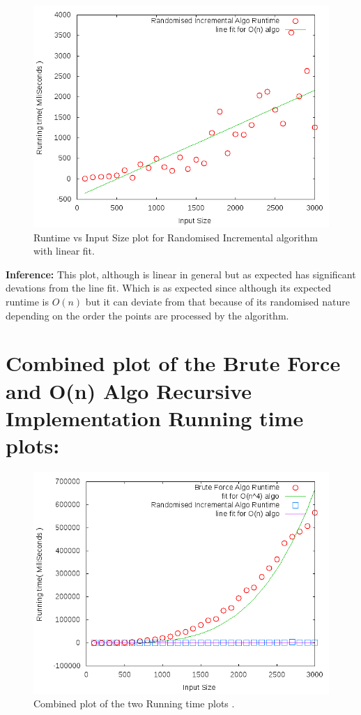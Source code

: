 \documentclass{article}
\begin{document}
\begin{figure}[th]%
\centering

\includegraphics[width=0.5\columnwidth]{incr1.png}%
\caption{Runtime vs Input Size plot for Randomised Incremental algorithm with linear fit. }
\label{fig:proto}%
\end{figure}
\textbf{Inference:} This plot, although is linear in general but as expected has significant devations from the line fit. Which is as expected since although its expected runtime is $O(n)$ but it can deviate from that because of its randomised nature depending on the order the points are processed by the algorithm. 

\newpage

\section*{Combined plot of the Brute Force and O(n) Algo Recursive Implementation Running time plots:}

\begin{figure}[th]%
\centering
\includegraphics{combine1.png}%
\hfill
\caption{Combined plot of the two Running time plots .}
\label{fig:proto}%
\end{figure}
\end{document}
